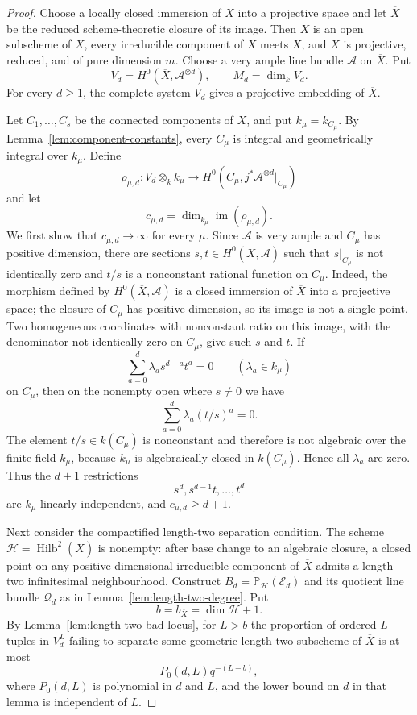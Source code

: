 \documentclass{lms}
\DeclareMathOperator{\Hilb}{Hilb}
\DeclareMathOperator{\im}{im}
\newcommand{\PP}{\mathbb P}
\newcommand{\Ample}{\mathcal A}
\newcommand{\barX}{\overline{X}}
\begin{document}
\begin{proof}
Choose a locally closed immersion of $X$ into a projective space and let $\barX$ be the reduced scheme-theoretic closure of its image.  Then $X$ is an open subscheme of $\barX$, every irreducible component of $\barX$ meets $X$, and $\barX$ is projective, reduced, and of pure dimension $m$.  Choose a very ample line bundle $\Ample$ on $\barX$.  Put
\[
        V_d=H^0(\barX,\Ample^{\otimes d}),
        \qquad
        M_d=\dim_kV_d.
\]
For every $d\ge1$, the complete system $V_d$ gives a projective embedding of $\barX$.

Let $C_1,\ldots,C_s$ be the connected components of $X$, and put $k_\mu=k_{C_\mu}$.  By Lemma~\ref{lem:component-constants}, every $C_\mu$ is integral and geometrically integral over $k_\mu$.  Define
\[
        \rho_{\mu,d}:V_d\otimes_k k_\mu
        \longrightarrow
        H^0(C_\mu,j^*\Ample^{\otimes d}|_{C_\mu})
\]
and let
\[
        c_{\mu,d}=\dim_{k_\mu}\im(\rho_{\mu,d}).
\]
We first show that $c_{\mu,d}\to\infty$ for every $\mu$.  Since $\Ample$ is very ample and $C_\mu$ has positive dimension, there are sections $s,t\in H^0(\barX,\Ample)$ such that $s|_{C_\mu}$ is not identically zero and $t/s$ is a nonconstant rational function on $C_\mu$.  Indeed, the morphism defined by $H^0(\barX,\Ample)$ is a closed immersion of $\barX$ into a projective space; the closure of $C_\mu$ has positive dimension, so its image is not a single point.  Two homogeneous coordinates with nonconstant ratio on this image, with the denominator not identically zero on $C_\mu$, give such $s$ and $t$.  If
\[
        \sum_{a=0}^d \lambda_a s^{d-a}t^a=0
        \qquad(\lambda_a\in k_\mu)
\]
on $C_\mu$, then on the nonempty open where $s\ne0$ we have
\[
        \sum_{a=0}^d \lambda_a(t/s)^a=0.
\]
The element $t/s\in k(C_\mu)$ is nonconstant and therefore is not algebraic over the finite field $k_\mu$, because $k_\mu$ is algebraically closed in $k(C_\mu)$.  Hence all $\lambda_a$ are zero.  Thus the $d+1$ restrictions
\[
        s^d,s^{d-1}t,\ldots,t^d
\]
are $k_\mu$-linearly independent, and $c_{\mu,d}\ge d+1$.

Next consider the compactified length-two separation condition.  The scheme $\mathcal H=\Hilb^2(\barX)$ is nonempty: after base change to an algebraic closure, a closed point on any positive-dimensional irreducible component of $\barX$ admits a length-two infinitesimal neighbourhood.  Construct $B_d=\PP_{\mathcal H}(\mathcal E_d)$ and its quotient line bundle $\mathcal Q_d$ as in Lemma~\ref{lem:length-two-degree}.  Put
\[
        b=b_{\barX}=\dim\mathcal H+1.
\]
By Lemma~\ref{lem:length-two-bad-locus}, for $L>b$ the proportion of ordered $L$-tuples in $V_d^L$ failing to separate some geometric length-two subscheme of $\barX$ is at most
\[
        P_0(d,L)q^{-(L-b)},
\]
where $P_0(d,L)$ is polynomial in $d$ and $L$, and the lower bound on $d$ in that lemma is independent of $L$.


\end{proof}
\end{document}
